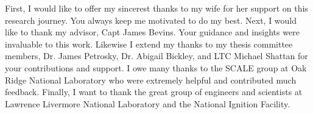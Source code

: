 \begin{acknowledgements}
First, I would like to offer my sincerest thanks to my wife for her support on this research journey. You always keep me motivated to do my best. 
Next, I would like to thank my advisor, Capt James Bevins. 
Your guidance and insights were invaluable to this work. 
Likewise I extend my thanks to my thesis committee members, Dr. James Petrosky, Dr. Abigail Bickley, and LTC Michael Shattan for your contributions and support. I owe many thanks to the SCALE group at Oak Ridge National Laboratory who were extremely helpful and contributed much feedback. Finally, I want to thank the great group of engineers and scientists at Lawrence Livermore National Laboratory and the National Ignition Facility. 

\end{acknowledgements}

